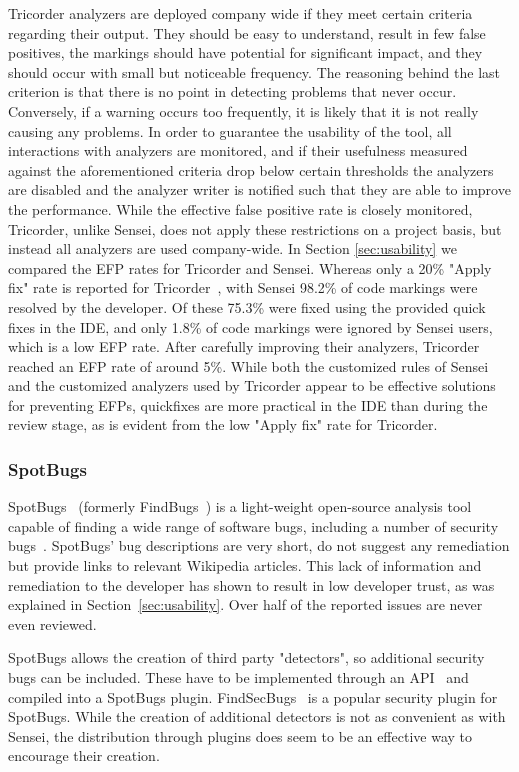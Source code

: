 Tricorder analyzers are deployed company wide if they meet certain criteria regarding their output. They should be easy to understand, result in few false positives, the markings should have potential for significant impact, and they should occur with small but noticeable frequency. The reasoning behind the last criterion is that there is no point in detecting problems that never occur. Conversely, if a warning occurs too frequently, it is likely that it is not really causing any problems. In order to guarantee the usability of the tool, all interactions with analyzers are monitored, and if their usefulness measured against the aforementioned criteria drop below certain thresholds the analyzers are disabled and the analyzer writer is notified such that they are able to improve the performance. While the effective false positive rate is closely monitored, Tricorder, unlike Sensei, does not apply these restrictions on a project basis, but instead all analyzers are used company-wide. In Section \ref{sec:usability} we compared the EFP rates for Tricorder and Sensei. Whereas only a 20\% "Apply fix" rate is reported for Tricorder~\cite{sadowski2015tricorder},  with Sensei 98.2\% of code markings were resolved by the developer. Of these 75.3\% were fixed using the provided quick fixes in the IDE, and only 1.8\% of code markings were ignored by Sensei users, which is a low EFP rate. After carefully improving their analyzers, Tricorder reached an EFP rate of around 5\%. While both the customized rules of Sensei and the customized analyzers used by Tricorder appear to be effective solutions for preventing EFPs, quickfixes are more practical in the IDE than during the review stage, as is evident from the low "Apply fix" rate for Tricorder. 

\subsubsection{SpotBugs}
SpotBugs~\cite{spotbugs} (formerly FindBugs~\cite{findbugs}) is a light-weight open-source analysis tool capable of finding a wide range of software bugs, including a number of security bugs~\cite{spotbugsdescriptions}. SpotBugs' bug descriptions are very short, do not suggest any remediation but provide links to relevant Wikipedia articles. This lack of information and remediation to the developer has shown to result in low developer trust, as was explained in Section~\ref{sec:usability}. Over half of the reported issues are never even reviewed.

SpotBugs allows the creation of third party "detectors", so additional security bugs can be included. These have to be implemented through an API~\cite{spotbugsapi} and compiled into a SpotBugs plugin. FindSecBugs~\cite{findsecbugs} is a popular security plugin for SpotBugs. While the creation of additional detectors is not as convenient as with Sensei, the distribution through plugins does seem to be an effective way to encourage their creation.

